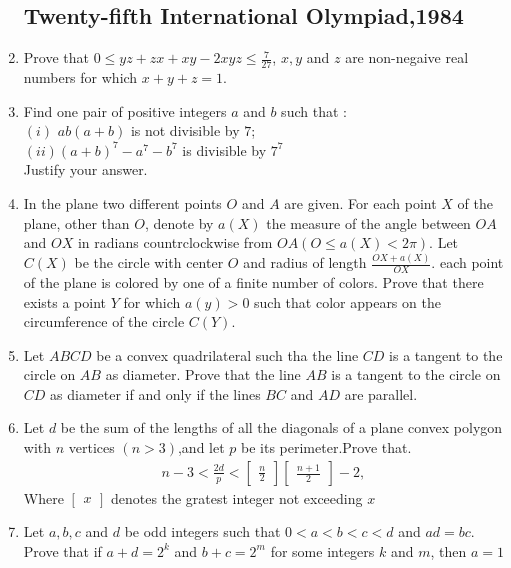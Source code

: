 \documentclass[12pt,-letter paper]{article}
\providecommand{\myvec}[1]{\ensuremath{\begin{bmatrix}#1\end{bmatrix}}}
\providecommand{\brak}[1]{\ensuremath{\left(#1\right)}}
\begin{document}
\begin{enumerate}


		\subsection*{Twenty-fifth International Olympiad,1984}
\item Prove that $0 \leq yz+zx+xy-2xyz \leq \frac{7}{27}$, $x,y$ and $z$ are non-negaive real numbers for which $x+y+z=1$.
\item Find one pair of positive integers $a$ and $b$ such that :\\
	\brak{i} $ab\brak{a+b}$ is not divisible by $7$;\\
		\brak{ii}$\brak{a+b}^7-a^7-b^7$ is divisible by $7^7$\\
		Justify your answer.
	\item In the plane two different points $O$ and $A$ are given. For each point $X$ of the plane, other than $O$, denote by $a\brak{X}$ the measure of the angle between $OA$ and $OX$ in radians countrclockwise from $OA\brak {O\leq a\brak{X}<2\pi}$. Let $C\brak{X}$ be the circle with center $O$ and radius of length $\frac {OX+a\brak{X}}{OX}$. each point  of the plane is colored by one of a finite number of colors. Prove that there exists a point $Y$ for which $a\brak{y}>0$ such that color appears on  the circumference of the circle $C\brak{Y}$.
\item Let $ABCD$ be a convex quadrilateral such tha the line $CD$ is a tangent to the circle on $AB$ as diameter. Prove that the line $AB$ is a tangent to the  circle on $CD$ as diameter if and only if the lines $BC$ and $AD$ are parallel.
\item Let $d$ be the sum of the lengths of all the diagonals of a plane convex polygon with $n$ vertices \brak{n>3},and let $p$ be its perimeter.Prove that.\begin{align*}
n-3<\frac{2d}{p}<\myvec{\frac{n}{2}}\myvec{\frac{n+1}{2}}-2,\end{align*} 
		Where \myvec{x} denotes the gratest integer not exceeding $x$
\item Let $a,b,c$ and $d$ be odd integers such that  $0<a<b<c<d$ and $ad=bc$. Prove that if $a+d=2^k$ and $b+c=2^m$ for some integers $k$ and $m$, then $a=1$ 	


\end{enumerate}
\end{document}
